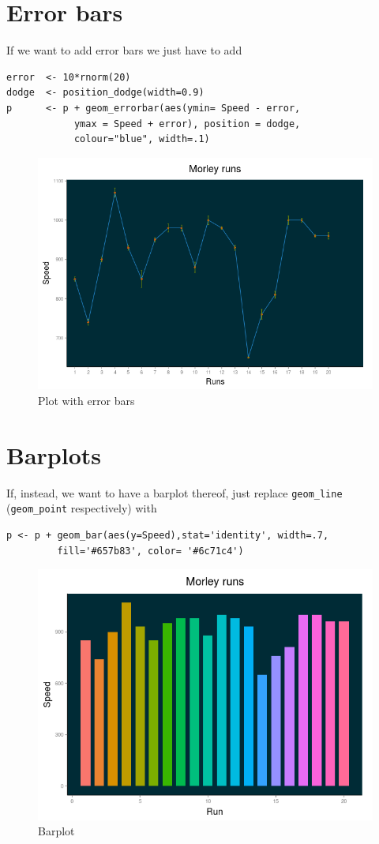 \section{Error bars}
If we want to add error bars we just have to add
\begin{verbatim}
error  <- 10*rnorm(20)
dodge  <- position_dodge(width=0.9)
p      <- p + geom_errorbar(aes(ymin= Speed - error, 
	        ymax = Speed + error), position = dodge,
            colour="blue", width=.1)
\end{verbatim}
\begin{figure}[htbp]
 \centering
 \includegraphics[scale=0.5]{images/error_bars}
 \caption*{Plot with error bars}
\end{figure}

\section{Barplots}
If, instead, we want to have a barplot thereof, just
replace \texttt{geom\_line} (\texttt{geom\_point} respectively)
with

\begin{verbatim}
p <- p + geom_bar(aes(y=Speed),stat='identity', width=.7,
         fill='#657b83', color= '#6c71c4')
\end{verbatim}
\begin{figure}[htbp]
 \centering
 \includegraphics[scale=0.5]{images/barplot}
 \caption*{Barplot}
\end{figure}
                  
